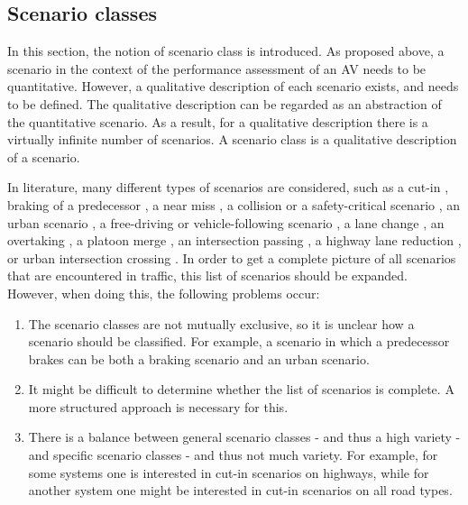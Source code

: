 \subsection{Scenario classes}
\label{sec:scenario classes}
In this section, the notion of scenario class is introduced. As proposed above, a scenario in the context of the performance assessment of an AV needs to be quantitative. However, a qualitative description of each scenario exists, and needs to be defined. The qualitative description can be regarded as an abstraction of the quantitative scenario. As a result, for a qualitative description there is a virtually infinite number of scenarios. A scenario class is a qualitative description of a scenario. 

In literature, many different types of scenarios are considered, such as a cut-in \cite{xu2002effects, gietelink2006development,roesener2017comprehensive}, braking of a predecessor \cite{xu2002effects,deGelder2017assessment,hulshof2013autonomous}, a near miss \cite{gietelink2006development}, a collision or a safety-critical scenario \cite{gietelink2006development,ebner2011identifying}, an urban scenario \cite{zofka2015datadrivetrafficscenarios}, a free-driving or vehicle-following scenario \cite{roesener2017comprehensive}, a lane change \cite{roesener2017comprehensive}, an overtaking \cite{karaduman2013interactivebehavior}, a platoon merge \cite{englund2016grand}, an intersection passing \cite{englund2016grand}, a highway lane reduction \cite{ploeg2017GCDC}, or urban intersection crossing \cite{ploeg2017GCDC}. In order to get a complete picture of all scenarios that are encountered in traffic, this list of scenarios should be expanded. However, when doing this, the following problems occur:

\begin{enumerate}
	\item The scenario classes are not mutually exclusive, so it is unclear how a scenario should be classified. For example, a scenario in which a predecessor brakes can be both a braking scenario and an urban scenario. \label{item:mutual exclusiveness}
	\item It might be difficult to determine whether the list of scenarios is complete. A more structured approach is necessary for this. \label{item:completeness}
	\item There is a balance between general scenario classes - and thus a high variety - and specific scenario classes - and thus not much variety. For example, for some systems one is interested in cut-in scenarios on highways, while for another system one might be interested in cut-in scenarios on all road types. \label{item:generality}
\end{enumerate}

